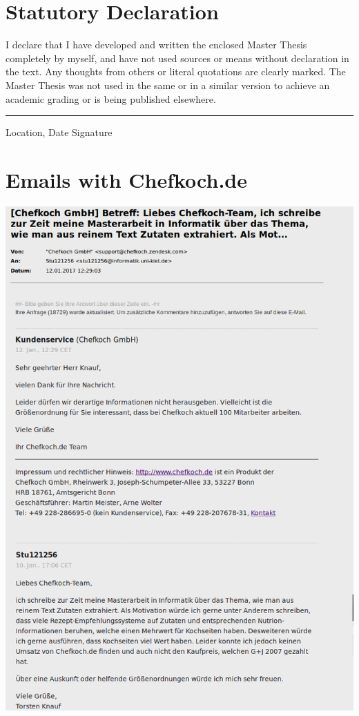 \documentclass[12pt, twoside]{report}
\begin{document}
\appendix
\chapter{Statutory Declaration}
I declare that I have developed and written the enclosed Master Thesis completely by myself, and have not used sources or means without declaration in the text. Any thoughts from others or literal quotations are clearly marked. The Master Thesis was not used in the same or in a similar version to achieve an academic grading or is being published elsewhere.
\newline
\newline
\newline
\rule{\textwidth}{1pt}
Location, Date \hfill Signature 

\chapter{Emails with Chefkoch.de} \label{appendix:emailChefkoch}
\vspace{-1cm}
\includegraphics[width=1\linewidth]{Images/emailChefkoch}
\end{document}
